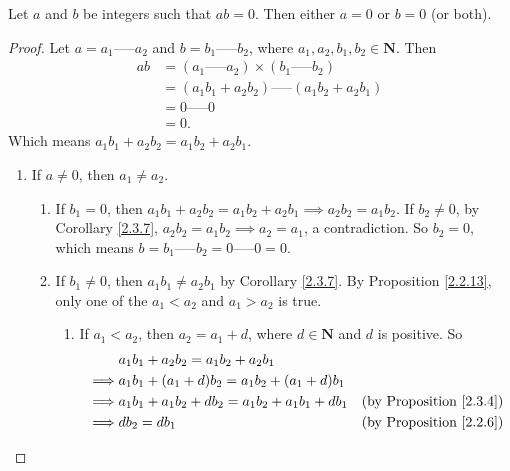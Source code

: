 \begin{proposition}\label{4.1.8}
Let \(a\) and \(b\) be integers such that \(ab = 0\).
Then either \(a = 0\) or \(b = 0\) (or both).
\end{proposition}

\begin{proof}
Let \(a = a_1 \text{-----} a_2\) and \(b = b_1 \text{-----} b_2\), where \(a_1, a_2, b_1, b_2 \in \mathbf{N}\).
Then
\begin{align*}
ab &= (a_1 \text{-----} a_2) \times (b_1 \text{-----} b_2) \\
&= (a_1b_1 + a_2b_2) \text{-----} (a_1b_2 + a_2b_1) \\
&= 0 \text{-----} 0 \\
&= 0.
\end{align*}
Which means \(a_1b_1 + a_2b_2 = a_1b_2 + a_2b_1\).
    \begin{enumerate}
        \item If \(a \neq 0\), then \(a_1 \neq a_2\).
            \begin{enumerate}[label=(\roman*)]
                \item If \(b_1 = 0\), then \(a_1b_1 + a_2b_2 = a_1b_2 + a_2b_1 \implies a_2b_2 = a_1b_2\).
                If \(b_2 \neq 0\), by Corollary \ref{2.3.7}, \(a_2b_2 = a_1b_2 \implies a_2 = a_1\), a contradiction.
                So \(b_2 = 0\), which means \(b = b_1 \text{-----} b_2 = 0 \text{-----} 0 = 0\).
                \item If \(b_1 \neq 0\), then \(a_1b_1 \neq a_2b_1\) by Corollary \ref{2.3.7}.
                By Proposition \ref{2.2.13}, only one of the \(a_1 < a_2\) and \(a_1 > a_2\) is true.
                \begin{enumerate}[label=(\arabic*)]
                    \item If \(a_1 < a_2\), then \(a_2 = a_1 + d\), where \(d \in \mathbf{N}\) and \(d\) is positive.
                    So
                        \begin{align*}
                            & a_1b_1 + a_2b_2 = a_1b_2 + a_2b_1 \\
                            \implies & a_1b_1 + (a_1 + d)b_2 = a_1b_2 + (a_1 + d)b_1 \\
                            \implies & a_1b_1 + a_1b_2 + db_2 = a_1b_2 + a_1b_1 + db_1 & \text{(by Proposition \ref{2.3.4})} \\
                            \implies & db_2 = db_1 & \text{(by Proposition \ref{2.2.6})} \\

\end{align*}
\end{enumerate}
\end{enumerate}
\end{enumerate}
\end{proof}
